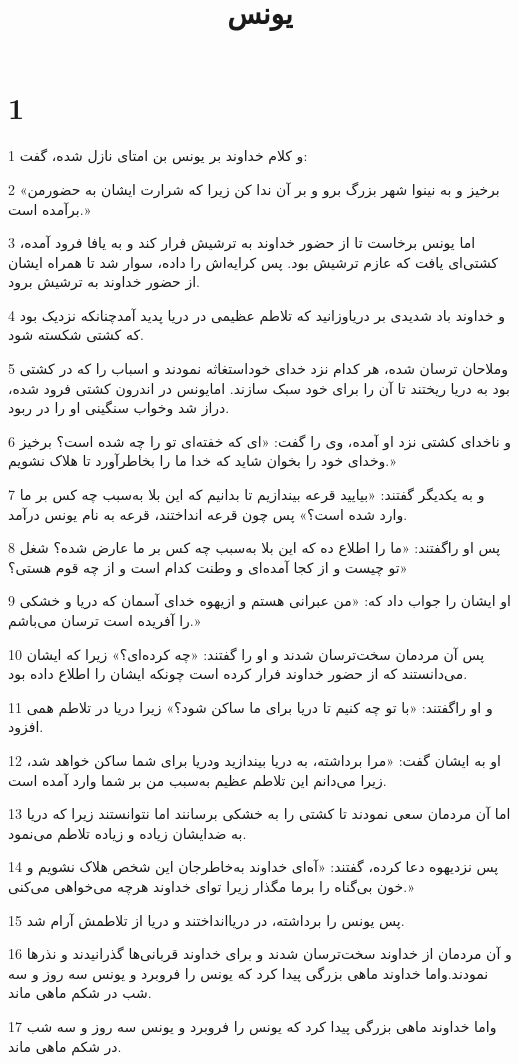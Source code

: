 

\title{يونس}


\chapter{1}

\par 1 و کلام خداوند بر یونس بن امتای نازل شده، گفت:
\par 2 «برخیز و به نینوا شهر بزرگ برو و بر آن ندا کن زیرا که شرارت ایشان به حضورمن برآمده است.»
\par 3 اما یونس برخاست تا از حضور خداوند به ترشیش فرار کند و به یافا فرود آمده، کشتی‌ای یافت که عازم ترشیش بود. پس کرایه‌اش را داده، سوار شد تا همراه ایشان از حضور خداوند به ترشیش برود.
\par 4 و خداوند باد شدیدی بر دریاوزانید که تلاطم عظیمی در دریا پدید آمدچنانکه نزدیک بود که کشتی شکسته شود.
\par 5 وملاحان ترسان شده، هر کدام نزد خدای خوداستغاثه نمودند و اسباب را که در کشتی بود به دریا ریختند تا آن را برای خود سبک سازند. امایونس در اندرون کشتی فرود شده، دراز شد وخواب سنگینی او را در ربود.
\par 6 و ناخدای کشتی نزد او آمده، وی را گفت: «ای که خفته‌ای تو را چه شده است؟ برخیز وخدای خود را بخوان شاید که خدا ما را بخاطرآورد تا هلاک نشویم.»
\par 7 و به یکدیگر گفتند: «بیایید قرعه بیندازیم تا بدانیم که این بلا به‌سبب چه کس بر ما وارد شده است؟» پس چون قرعه انداختند، قرعه به نام یونس درآمد.
\par 8 پس او راگفتند: «ما را اطلاع ده که این بلا به‌سبب چه کس بر ما عارض شده؟ شغل تو چیست و از کجا آمده‌ای و وطنت کدام است و از چه قوم هستی؟»
\par 9 او ایشان را جواب داد که: «من عبرانی هستم و ازیهوه خدای آسمان که دریا و خشکی را آفریده است ترسان می‌باشم.»
\par 10 پس آن مردمان سخت‌ترسان شدند و او را گفتند: «چه کرده‌ای؟» زیرا که ایشان می‌دانستند که از حضور خداوند فرار کرده است چونکه ایشان را اطلاع داده بود.
\par 11 و او راگفتند: «با تو چه کنیم تا دریا برای ما ساکن شود؟» زیرا دریا در تلاطم همی افزود.
\par 12 او به ایشان گفت: «مرا برداشته، به دریا بیندازید ودریا برای شما ساکن خواهد شد، زیرا می‌دانم این تلاطم عظیم به‌سبب من بر شما وارد آمده است.
\par 13 اما آن مردمان سعی نمودند تا کشتی را به خشکی برسانند اما نتوانستند زیرا که دریا به ضدایشان زیاده و زیاده تلاطم می‌نمود.
\par 14 پس نزدیهوه دعا کرده، گفتند: «آه‌ای خداوند به‌خاطرجان این شخص هلاک نشویم و خون بی‌گناه را برما مگذار زیرا تو‌ای خداوند هر‌چه می‌خواهی می‌کنی.»
\par 15 پس یونس را برداشته، در دریاانداختند و دریا از تلاطمش آرام شد.
\par 16 و آن مردمان از خداوند سخت‌ترسان شدند و برای خداوند قربانی‌ها گذرانیدند و نذرها نمودند.واما خداوند ماهی بزرگی پیدا کرد که یونس را فروبرد و یونس سه روز و سه شب در شکم ماهی ماند.
\par 17 واما خداوند ماهی بزرگی پیدا کرد که یونس را فروبرد و یونس سه روز و سه شب در شکم ماهی ماند.

